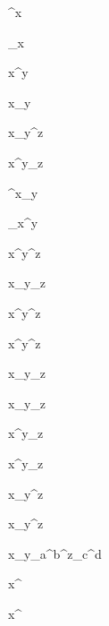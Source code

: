 ^x

_x

x^y

x_y

x_y^z

x^y_z

^x_y

_x^y

x^y^z

x_y_z

x^{y^z}

{x^y}^z

x_{y_z}

{x_y}_z

x^{y_z}

{x^y}_z

x_{y^z}

{x_y}^z

x_{y_a^b}^{z_c^d}

x^

x^{}
